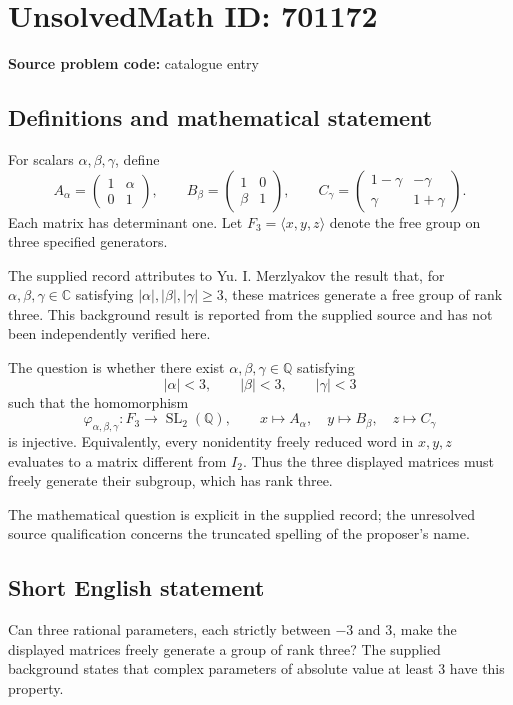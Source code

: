 \documentclass[11pt]{article}
\newcommand{\Q}{\mathbb{Q}}
\newcommand{\C}{\mathbb{C}}
\begin{document}
\section*{UnsolvedMath ID: 701172}
\textbf{Source problem code:} catalogue entry
\subsection{Definitions and mathematical statement}
For scalars \(\alpha,\beta,\gamma\), define
\[
A_\alpha=\begin{pmatrix}1&\alpha\\0&1\end{pmatrix},\qquad
B_\beta=\begin{pmatrix}1&0\\\beta&1\end{pmatrix},\qquad
C_\gamma=\begin{pmatrix}1-\gamma&-\gamma\\\gamma&1+\gamma\end{pmatrix}.
\]
Each matrix has determinant one. Let \(F_3=\langle x,y,z\rangle\) denote the free group on three specified generators.

The supplied record attributes to Yu. I. Merzlyakov the result that, for \(\alpha,\beta,\gamma\in\C\) satisfying \(|\alpha|,|\beta|,|\gamma|\geq 3\), these matrices generate a free group of rank three. This background result is reported from the supplied source and has not been independently verified here.

The question is whether there exist \(\alpha,\beta,\gamma\in\Q\) satisfying
\[
|\alpha|<3,\qquad |\beta|<3,\qquad |\gamma|<3
\]
such that the homomorphism
\[
\varphi_{\alpha,\beta,\gamma}:F_3\longrightarrow\operatorname{SL}_2(\Q),\qquad
x\longmapsto A_\alpha,\quad y\longmapsto B_\beta,\quad z\longmapsto C_\gamma
\]
is injective. Equivalently, every nonidentity freely reduced word in \(x,y,z\) evaluates to a matrix different from \(I_2\). Thus the three displayed matrices must freely generate their subgroup, which has rank three.

The mathematical question is explicit in the supplied record; the unresolved source qualification concerns the truncated spelling of the proposer's name.
\subsection{Short English statement}
Can three rational parameters, each strictly between \(-3\) and \(3\), make the displayed matrices freely generate a group of rank three? The supplied background states that complex parameters of absolute value at least \(3\) have this property.
\end{document}

